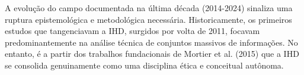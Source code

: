 \documentclass[12pt]{article}
\begin{document}

    A evolução do campo documentada na última década (2014-2024) sinaliza uma ruptura epistemológica e metodológica necessária. Historicamente, os primeiros estudos que tangenciavam a IHD, surgidos por volta de 2011, focavam predominantemente na análise técnica de conjuntos massivos de informações. No entanto, é a partir dos trabalhos fundacionais de Mortier et al. (2015\nocite{mortier2015humandatainteractionhumanface}) que a IHD se consolida genuinamente como uma disciplina ética e conceitual autônoma. 
\end{document}
